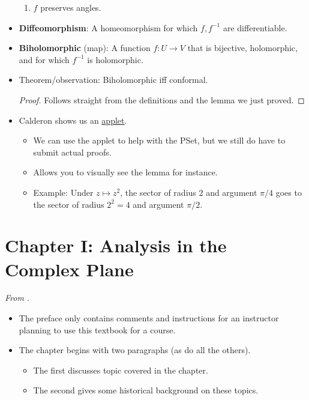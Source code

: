 \documentclass[../notes.tex]{subfiles}
\begin{document}
\begin{itemize}
\begin{enumerate}
        \item $f$ preserves angles.
    \end{enumerate}
    \item \textbf{Diffeomorphism}: A homeomorphism for which $f,f^{-1}$ are differentiable.
    \item \textbf{Biholomorphic} (map): A function $f:U\to V$ that is bijective, holomorphic, and for which $f^{-1}$ is holomorphic.
    \item Theorem/observation: Biholomorphic iff conformal.
    \begin{proof}
        Follows straight from the definitions and the lemma we just proved.
    \end{proof}
    \item Calderon shows us an \href{https://wqferr.github.io/SimplyComplex/}{applet}.
    \begin{itemize}
        \item We can use the applet to help with the PSet, but we still do have to submit actual proofs.
        \item Allows you to visually see the lemma for instance.
        \item Example: Under $z\mapsto z^2$, the sector of radius 2 and argument $\pi/4$ goes to the sector of radius $2^2=4$ and argument $\pi/2$.
    \end{itemize}
\end{itemize}



\section{Chapter I: Analysis in the Complex Plane}
\emph{From \textcite{bib:FischerLieb}.}
\begin{itemize}
    \item {}The preface only contains comments and instructions for an instructor planning to use this textbook for a course.
    \item The chapter begins with two paragraphs (as do all the others).
    \begin{itemize}
        \item The first discusses topic covered in the chapter.
        \item The second gives some historical background on these topics.
    \end{itemize}
\end{itemize}
\end{document}
